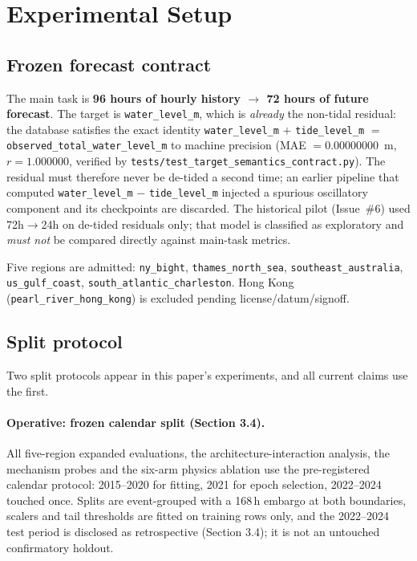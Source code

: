 \section{Experimental Setup}
\label{sec:exp}

\subsection{Frozen forecast contract}
The main task is \textbf{96 hours of hourly history $\rightarrow$ 72 hours of future forecast}.
The target is \texttt{water\_level\_m}, which is \emph{already} the non-tidal
residual: the database satisfies the exact identity
\texttt{water\_level\_m} $+$ \texttt{tide\_level\_m} $=$
\texttt{observed\_total\_water\_level\_m} to machine precision
(MAE $=0.00000000$~m, $r=1.000000$, verified by
\texttt{tests/test\_target\_semantics\_contract.py}). The residual must therefore
never be de-tided a second time; an earlier pipeline that computed
\texttt{water\_level\_m} $-$ \texttt{tide\_level\_m} injected a spurious
oscillatory component and its checkpoints are discarded.
The historical pilot (Issue~\#6) used 72h$\rightarrow$24h on de-tided residuals only;
that model is classified as exploratory and \emph{must not} be compared directly
against main-task metrics.

Five regions are admitted: \texttt{ny\_bight}, \texttt{thames\_north\_sea},
\texttt{southeast\_australia}, \texttt{us\_gulf\_coast}, \texttt{south\_atlantic\_charleston}.
Hong Kong (\texttt{pearl\_river\_hong\_kong}) is excluded pending license/datum/signoff.

\subsection{Split protocol}
Two split protocols appear in this paper's experiments, and all current
claims use the first.

\paragraph{Operative: frozen calendar split (Section 3.4).} All five-region
expanded evaluations, the architecture-interaction analysis, the
mechanism probes and the six-arm physics ablation use the pre-registered
calendar protocol: 2015--2020 for fitting, 2021 for epoch selection,
2022--2024 touched once. Splits are event-grouped with a 168\,h embargo at
both boundaries, scalers and tail thresholds are fitted on training rows
only, and the 2022--2024 test period is disclosed as retrospective
(Section 3.4); it is not an untouched confirmatory holdout.

